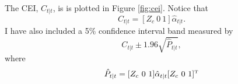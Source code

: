
The CEI, $C_{t|t}$,  is is plotted in Figure \ref{fig:cei}. Notice that  $$C_{t|t} = [Z_c \ 0 \ 1] \hat{\alpha}_{t|t}.$$ I have also included a 5\% confidence interval band measured by $$C_{t|t}\pm 1.96 \sqrt{\hat{P}_{t|t}},$$ where $$\hat{P}_{t|t} = [Z_c \ 0 \ 1] \hat{\alpha}_{t|t}[Z_c \ 0 \ 1]^{\text{\tiny T}}$$



%	
%
%
